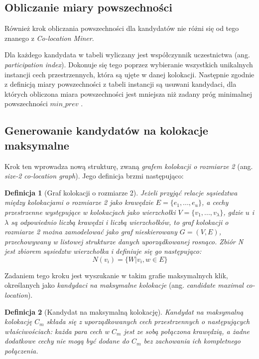 \documentclass[12pt]{article}
\newtheorem{defin}{Definicja}
\begin{document}
\subsection{Obliczanie miary powszechności}

Również krok obliczania powszechności dla kandydatów nie różni się od tego znanego z \textit{Co-location Miner}.

Dla każdego kandydata w tabeli wyliczany jest współczynnik uczestnictwa (ang. \textit{participation index}). Dokonuje się tego poprzez wybieranie wszystkich unikalnych instancji cech przestrzennych, która są ujęte w danej kolokacji. Następnie zgodnie z definicją miary powszechności z tabeli instancji są usuwani kandydaci, dla których obliczona miara powszechności jest mniejsza niż zadany próg minimalnej powszechności $ min\_prev $ \cite{huang}. 

\subsection{Generowanie kandydatów na kolokacje maksymalne}

Krok ten wprowadza nową strukturę, zwaną \textit{grafem kolokacji o rozmiarze 2} (ang. \textit{size-2 co-location graph}). Jego definicja brzmi następująco:

\begin{defin}[Graf kolokacji o rozmiarze 2]
Jeżeli przyjąć relacje sąsiedztwa między kolokacjami o rozmiarze 2 jako krawędzie $ E = \{e_{1},...,e_{u}\}$, a cechy przestrzenne występujące w kolokacjach jako wierzchołki $ V = \{v_{1},...,v_{\lambda}\}$, gdzie $ u $ i $ \lambda $ są odpowiednio liczbą krawędzi i liczbą wierzchołków, to graf kolokacji o rozmiarze 2 można zamodelować jako graf nieskierowany $ G= (V, E)$, przechowywany w listowej strukturze danych uporządkowanej rosnąco. Zbiór N jest zbiorem sąsiedztw wierzchołka i definiuje się go następująco:
\begin{equation}
N(v_{i}) = \{W|{v_{i},w} \in E\}
\end{equation}
\label{def:size2-col-graph}
\end{defin}

Zadaniem tego kroku jest wyszukanie w takim grafie maksymalnych klik, określanych jako \textit{kandydaci na maksymalne kolokacje} (ang. \textit{candidate maximal co-location}).

\begin{defin}[Kandydat na maksymalną kolokację]
Kandydat na maksymalną kolokację $ C_{m} $ składa się z uporządkowanych cech przestrzennych o następujących właściwościach: każda para cech w  $ C_{m} $  jest ze sobą połączona krawędzią, a żadne dodatkowe cechy nie mogą być dodane do $ C_{m} $ bez zachowania ich kompletnego połączenia.
\end{defin}
\end{document}
